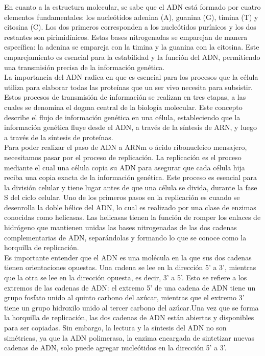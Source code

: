 \documentclass[12pt]{article}
\begin{document}
En cuanto a la estructura molecular, se sabe que el ADN está formado por cuatro elementos fundamentales: los nucleótidos adenina (A), guanina (G), timina (T) y citosina (C). Los dos primeros corresponden a los nucleótidos purínicos y los dos restantes son pirimidínicos. Estas bases nitrogenadas se emparejan de manera específica: la adenina se empareja con la timina y la guanina con la citosina. Este emparejamiento es esencial para la estabilidad y la función del ADN, permitiendo una transmisión precisa de la información genética.\\

La importancia del ADN radica en que es esencial para los procesos que la célula utiliza para elaborar todas las proteínas que un ser vivo necesita para subsistir. Estos procesos de transmisión de información se realizan en tres etapas, a las cuales se denomina el dogma central de la biología molecular. Este concepto describe el flujo de información genética en una célula, estableciendo que la información genética fluye desde el ADN, a través de la síntesis de ARN, y luego a través de la síntesis de proteínas.\\

Para poder realizar el paso de ADN a ARNm o ácido ribonucleico mensajero, necesitamos pasar por el proceso de replicación. La replicación es el proceso mediante el cual una célula copia su ADN para asegurar que cada célula hija reciba una copia exacta de la información genética. Este proceso es esencial para la división celular y tiene lugar antes de que una célula se divida, durante la fase S del ciclo celular. Uno de los primeros pasos en la replicación es cuando se desenrolla la doble hélice del ADN, lo cual es realizado por una clase de enzimas conocidas como helicasas. Las helicasas tienen la función de romper los enlaces de hidrógeno que mantienen unidas las bases nitrogenadas de las dos cadenas complementarias de ADN, separándolas y formando lo que se conoce como la horquilla de replicación.\\

Es importante entender que el ADN es una molécula en la que sus dos cadenas tienen orientaciones opuestas. Una cadena se lee en la dirección 5' a 3', mientras que la otra se lee en la dirección opuesta, es decir, 3' a 5'. Esto se refiere a los extremos de las cadenas de ADN: el extremo 5' de una cadena de ADN tiene un grupo fosfato unido al quinto carbono del azúcar, mientras que el extremo 3' tiene un grupo hidroxilo unido al tercer carbono del azúcar.Una vez que se forma la horquilla de replicación, las dos cadenas de ADN están abiertas y disponibles para ser copiadas. Sin embargo, la lectura y la síntesis del ADN no son simétricas, ya que la ADN polimerasa, la enzima encargada de sintetizar nuevas cadenas de ADN, solo puede agregar nucleótidos en la dirección 5' a 3'.\\
\end{document}
